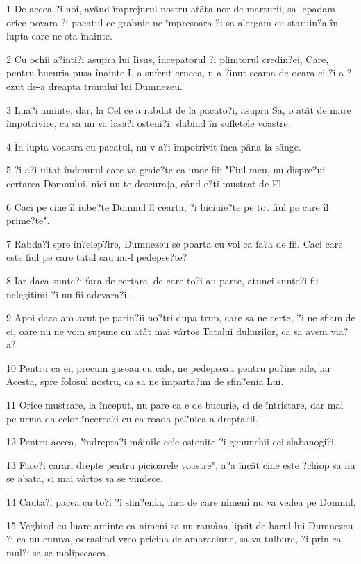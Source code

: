 \par 1 De aceea ?i noi, având împrejurul nostru atâta nor de marturii, sa lepadam orice povara ?i pacatul ce grabnic ne împresoara ?i sa alergam cu staruin?a în lupta care ne sta înainte.
\par 2 Cu ochii a?inti?i asupra lui Iisus, începatorul ?i plinitorul credin?ei, Care, pentru bucuria pusa înainte-I, a suferit crucea, n-a ?inut seama de ocara ei ?i a ?ezut de-a dreapta tronului lui Dumnezeu.
\par 3 Lua?i aminte, dar, la Cel ce a rabdat de la pacato?i, asupra Sa, o atât de mare împotrivire, ca sa nu va lasa?i osteni?i, slabind în sufletele voastre.
\par 4 În lupta voastra cu pacatul, nu v-a?i împotrivit înca pâna la sânge.
\par 5 ?i a?i uitat îndemnul care va graie?te ca unor fii: "Fiul meu, nu dispre?ui certarea Domnului, nici nu te descuraja, când e?ti mustrat de El.
\par 6 Caci pe cine îl iube?te Domnul îl cearta, ?i biciuie?te pe tot fiul pe care îl prime?te".
\par 7 Rabda?i spre în?elep?ire, Dumnezeu se poarta cu voi ca fa?a de fii. Caci care este fiul pe care tatal sau nu-l pedepse?te?
\par 8 Iar daca sunte?i fara de certare, de care to?i au parte, atunci sunte?i fii nelegitimi ?i nu fii adevara?i.
\par 9 Apoi daca am avut pe parin?ii no?tri dupa trup, care sa ne certe, ?i ne sfiam de ei, oare nu ne vom supune cu atât mai vârtos Tatalui duhurilor, ca sa avem via?a?
\par 10 Pentru ca ei, precum gaseau cu cale, ne pedepseau pentru pu?ine zile, iar Acesta, spre folosul nostru, ca sa ne împarta?im de sfin?enia Lui.
\par 11 Orice mustrare, la început, nu pare ca e de bucurie, ci de întristare, dar mai pe urma da celor încerca?i cu ea roada pa?nica a drepta?ii.
\par 12 Pentru aceea, "îndrepta?i mâinile cele ostenite ?i genunchii cei slabanogi?i.
\par 13 Face?i carari drepte pentru picioarele voastre", a?a încât cine este ?chiop sa nu se abata, ci mai vârtos sa se vindece.
\par 14 Cauta?i pacea cu to?i ?i sfin?enia, fara de care nimeni nu va vedea pe Domnul,
\par 15 Veghind cu luare aminte ca nimeni sa nu ramâna lipsit de harul lui Dumnezeu ?i ca nu cumva, odraslind vreo pricina de amaraciune, sa va tulbure, ?i prin ea mul?i sa se molipseasca.
